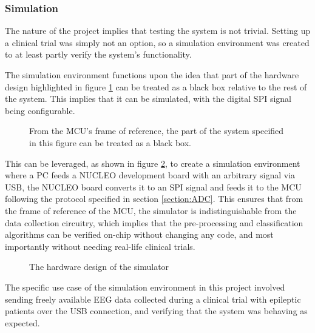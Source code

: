 \subsubsection{Simulation}
The nature of the project implies that testing the system is not trivial. Setting up a clinical trial was simply not an option, so a simulation environment was created to at least partly verify the system's functionality.



The simulation environment functions upon the idea that part of the hardware design highlighted in figure \ref{fig:blackbox} can be treated as a black box relative to the rest of the system. This implies that it can be simulated, with the digital SPI signal being configurable.

\begin{figure} [H]
\begin{center}

   \caption{From the MCU's frame of reference, the part of the system specified in this figure can be treated as a black box.}
    \label{fig:blackbox}
\end{center}
\end{figure}

This can be leveraged, as shown in figure \ref{fig:simulator}, to create a simulation environment where a PC feeds a NUCLEO development board with an arbitrary signal via USB, the NUCLEO board converts it to an SPI signal and feeds it to the MCU following the protocol specified in section \ref{section:ADC}. This ensures that from the frame of reference of the MCU, the simulator is indistinguishable from the data collection circuitry, which implies that the pre-processing and classification algorithms can be verified on-chip without changing any code, and most importantly without needing real-life clinical trials.

\begin{figure} [H]
\begin{center}

   \caption{The hardware design of the simulator}
    \label{fig:simulator}
\end{center}
\end{figure}

The specific use case of the simulation environment in this project involved sending freely available EEG data collected during a clinical trial with epileptic patients \cite{CHB-MIT} over the USB connection, and verifying that the system was behaving as expected.

